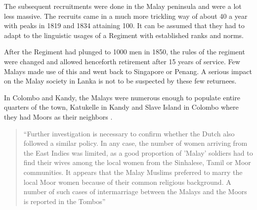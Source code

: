 The subsequent recruitments were done in the Malay peninsula and were a lot less massive. The recruits came in a much more trickling way of about 40 a year with  peaks in 1819 and 1834 attaining 100. It can be assumed that they had to adapt to the linguistic usages of a Regiment with established ranks and norms.

%

After the Regiment had  plunged to 1000 men in 1850, the rules of the regiment were changed and allowed henceforth retirement after 15 years of service. Few Malays made use of this and went back to Singapore or Penang. A serious impact on the Malay society in Lanka is not to be suspected by these few returnees.

In Colombo and Kandy, the Malays were numerous enough to populate entire quarters of the town, Katukelle in Kandy and Slave Island in Colombo  where they had Moors as their neighbors \citep[111f]{Hussainmiya1990}.


\begin{quote}
    ``Further investigation is necessary to confirm whether the Dutch also followed a similar policy. In any case, the number of women arriving from the East Indies was limited, as a good proportion of 'Malay' soldiers had to find their wives among the local women from the Sinhalese, Tamil or Moor communities. It appears that the Malay Muslims preferred to marry the local Moor women because of their common religious background. A number of such cases of intermarriage between the Malays and the Moors is reported in the Tombos'' \citep[52]{Hussainmiya1987}
\end{quote}



